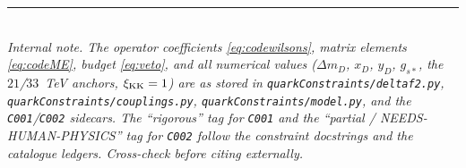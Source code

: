 \documentclass[11pt]{article}
\newcommand{\code}[1]{\texttt{#1}}
\newcommand{\xD}{x_D}
\newcommand{\yD}{y_D}
\newcommand{\dmD}{\Delta m_D}
\theoremstyle{definition}
\begin{document}
\bigskip
\noindent\rule{\linewidth}{0.4pt}\\
\footnotesize
\emph{Internal note. The operator coefficients \eqref{eq:codewilsons}, matrix
elements \eqref{eq:codeME}, budget \eqref{eq:veto}, and all numerical values
($\dmD$, $\xD$, $\yD$, $g_{s*}$, the $21$/$33$~TeV anchors, $\xi_{\rm KK}=1$) are
as stored in \code{quarkConstraints/deltaf2.py},
\code{quarkConstraints/couplings.py}, \code{quarkConstraints/model.py}, and the
\code{C001}/\code{C002} sidecars. The ``rigorous'' tag for \code{C001} and the
``partial / NEEDS-HUMAN-PHYSICS'' tag for \code{C002} follow the constraint
docstrings and the catalogue ledgers. Cross-check before citing externally.}
\end{document}

